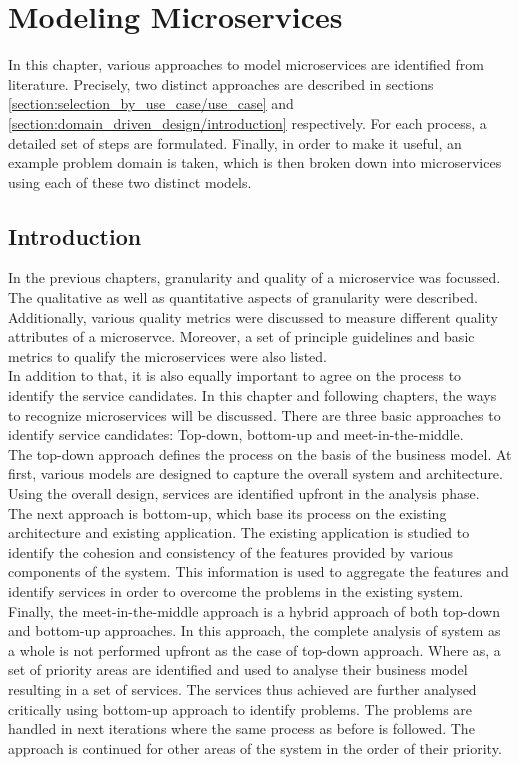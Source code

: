 \chapter{Modeling Microservices}\label{chapter:service_candidate}
In this chapter, various approaches to model microservices are identified from literature. Precisely, two distinct approaches are described in sections \ref{section:selection_by_use_case/use_case} and \ref{section:domain_driven_design/introduction} respectively. For each process, a detailed set of steps are formulated. Finally, in order to make it useful, an example problem domain is taken, which is then broken down into microservices using each of these two distinct models.
\section{Introduction}\label{section:service_candidate/introduction}
In the previous chapters, granularity and quality of a microservice was focussed. The qualitative as well as quantitative aspects of granularity were described. Additionally, various quality metrics were discussed to measure different quality attributes of a microservce. Moreover, a set of principle guidelines and basic metrics to qualify the microservices were also listed.\\
In addition to that, it is also equally important to agree on the process to identify the service candidates. In this chapter and following chapters, the ways to recognize microservices will be discussed.
There are three basic approaches to identify service candidates: Top-down, bottom-up and meet-in-the-middle. \\
The top-down approach defines the process on the basis of the business model. At first, various models are designed to capture the overall system and architecture. Using the overall design, services are identified upfront in the analysis phase.\\
The next approach is bottom-up, which base its process on the existing architecture and existing application. The existing application is studied to identify the cohesion and consistency of the features provided by various components of the system. This information is used to aggregate the features and identify services in order to overcome the problems in the existing system.\\
Finally, the meet-in-the-middle approach is a hybrid approach of both top-down and bottom-up approaches. In this approach, the complete analysis of system as a whole is not performed upfront as the case of top-down approach. Where as, a set of priority areas are identified and used to analyse their business model resulting in a set of services. The services thus achieved are further analysed critically using bottom-up approach to identify problems. The problems are handled in next iterations where the same process as before is followed. The approach is continued for other areas of the system in the order of their priority.\cite{Pierre-Reldin:2007aa}\cite{Arsanjani:2004aa}\\
